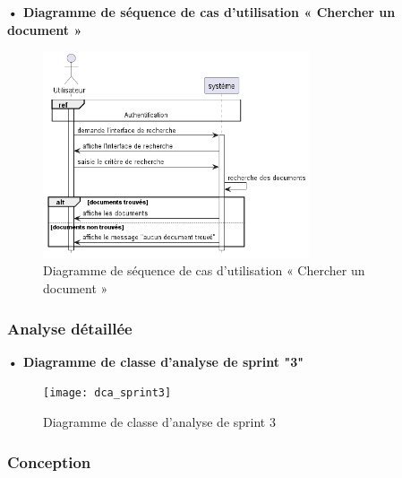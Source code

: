 \textbf{•	Diagramme de séquence de cas d'utilisation « Chercher un document  »}
\begin{figure}[H]
  \centering
  \includegraphics[width=0.7\textwidth]{out/diagrams/documents/chercher/charcher_document}
  \caption{Diagramme de séquence de cas d'utilisation « Chercher un document  »}
  \label{fig:sequence_charcher_document}
\end{figure}

\subsubsection{Analyse détaillée}
\textbf{•	Diagramme de classe d'analyse de sprint "3" }
\newpage

\begin{figure}
  \centering
  \texttt{[image: dca\_sprint3]}
  \caption{Diagramme de classe d'analyse de sprint 3}
  \label{fig:class_analyse_signatures3}
\end{figure}


\subsubsection{Conception}

